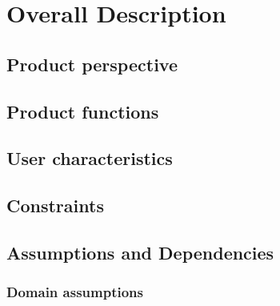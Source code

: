\chapter{Overall Description}

\section{Product perspective}

\section{Product functions}

\section{User characteristics}

\section{Constraints}

\section{Assumptions and Dependencies}

\subsection{Domain assumptions}
